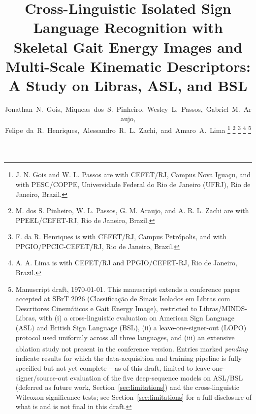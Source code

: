 \documentclass[journal]{IEEEtran}
\newcommand{\tbd}[1]{\textit{#1}\textsuperscript{\dag}}   %
\begin{document}
\title{Cross-Linguistic Isolated Sign Language Recognition with Skeletal Gait Energy Images and Multi-Scale Kinematic Descriptors: A Study on Libras, ASL, and BSL}

\author{
  Jonathan~N.~Gois,~Miqueas~dos~S.~Pinheiro,~Wesley~L.~Passos,~Gabriel~M.~Araujo,\\
  Felipe~da~R.~Henriques,~Alessandro~R.~L.~Zachi,~and~Amaro~A.~Lima
  \thanks{J. N. Gois and W. L. Passos are with CEFET/RJ, Campus Nova Iguaçu, and with PESC/COPPE, Universidade Federal do Rio de Janeiro (UFRJ), Rio de Janeiro, Brazil.}
  \thanks{M. dos S. Pinheiro, W. L. Passos, G. M. Araujo, and A. R. L. Zachi are with PPEEL/CEFET-RJ, Rio de Janeiro, Brazil.}
  \thanks{F. da R. Henriques is with CEFET/RJ, Campus Petrópolis, and with PPGIO/PPCIC-CEFET/RJ, Rio de Janeiro, Brazil.}
  \thanks{A. A. Lima is with CEFET/RJ and PPGIO/CEFET-RJ, Rio de Janeiro, Brazil.}
  \thanks{Manuscript draft, \today. This manuscript extends a conference paper accepted at SBrT 2026 (Classificação de Sinais Isolados em Libras com Descritores Cinemáticos e Gait Energy Image), restricted to Libras/MINDS-Libras, with (i) a cross-linguistic evaluation on American Sign Language (ASL) and British Sign Language (BSL), (ii) a leave-one-signer-out (LOPO) protocol used uniformly across all three languages, and (iii) an extensive ablation study not present in the conference version. Entries marked \tbd{pending} indicate results for which the data-acquisition and training pipeline is fully specified but not yet complete -- as of this draft, limited to leave-one-signer/source-out evaluation of the five deep-sequence models on ASL/BSL (deferred as future work, Section~\ref{sec:limitations}) and the cross-linguistic Wilcoxon significance tests; see Section~\ref{sec:limitations} for a full disclosure of what is and is not final in this draft.}
}


\maketitle
\end{document}
